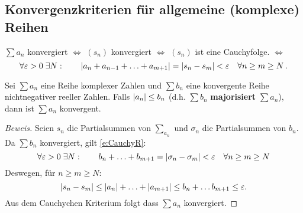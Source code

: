 \subsection{Konvergenzkriterien für allgemeine (komplexe) Reihen}
\begin{Bem}
  $\sum a_n$ konvergiert $\iff$ $(s_n)$ konvergiert $\iff$ $(s_n)$ 
ist eine Cauchyfolge. $\iff$ 
\begin{equation}\label{e:CauchyR}
\forall\varepsilon>0\;
\exists N: \qquad 
|a_n+ a_{n-1} + \ldots + a_{m+1}|= \mathopen| s_n-s_m \mathclose|<\varepsilon
\quad \forall n\geq m\geq N\, .
\end{equation}
\end{Bem}
\begin{Kor}[Majorantenkriterium] Sei $\sum a_n$ eine 
Reihe komplexer Zahlen und $\sum b_n$ 
eine konvergente Reihe nichtnegativer reeller Zahlen. 
Falls $\mathopen| a_n \mathclose|\leq b_n$ (d.h. $\sum b_n$ {\bf majorisiert} $\sum a_n$), 
dann ist $\sum a_n$ konvergent.
\end{Kor}
\begin{proof}[Beweis] Seien $s_n$ die Partialsummen von $\sum_{a_n}$
und $\sigma_n$ die Partialsummen von $b_n$. Da $\sum b_n$
konvergiert, gilt \eqref{e:CauchyR}:
\[\forall \varepsilon>0\; \exists N:\qquad
b_n+\ldots+b_{m+1} = \mathopen| \sigma_n-\sigma_m \mathclose|<\varepsilon\quad\forall n\geq m\geq N\]
Deswegen, f\"ur $n\geq m\geq N$:
\[|s_n-s_m| \leq \mathopen| a_n \mathclose|+\ldots+\mathopen| a_{m+1} \mathclose|\leq
b_n + \ldots b_{m+1} \leq \varepsilon. \]
Aus dem Cauchychen Kriterium folgt dass $\sum a_n$ konvergiert.
\end{proof}
